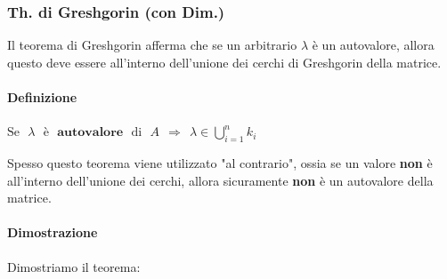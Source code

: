 \documentclass{article}
\begin{document}
\subsubsection{Th. di Greshgorin (con Dim.)}

Il teorema di Greshgorin afferma che se un arbitrario $\lambda$ è un autovalore, allora questo deve essere all'interno dell'unione dei cerchi di Greshgorin della matrice.

\paragraph{Definizione} $\boxed{\text{Se} \: \: \: \lambda \: \: \: \text{è} \: \: \: \textbf{autovalore} \: \: \: \text{di} \: \: \: A \: \:\Rightarrow \: \: \lambda \in \bigcup_{i=1}^{n}k_{i}} $

\vspace*{12px}

Spesso questo teorema viene utilizzato "al contrario", ossia se un valore \textbf{non} è all'interno dell'unione dei cerchi, allora sicuramente \textbf{non} è un autovalore della matrice.

\paragraph{Dimostrazione} Dimostriamo il teorema:
\end{document}

